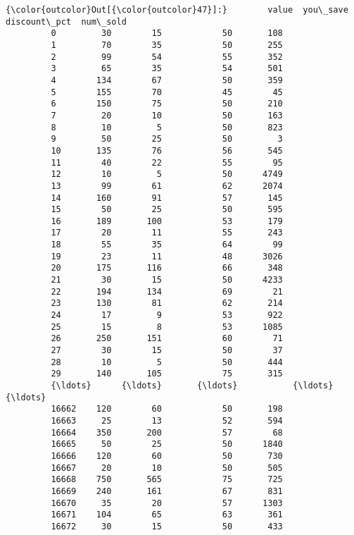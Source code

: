 \documentclass{article}
\begin{document}
            \begin{Verbatim}[commandchars=\\\{\}]
{\color{outcolor}Out[{\color{outcolor}47}]:}        value  you\_save  discount\_pct  num\_sold
         0         30        15            50       108
         1         70        35            50       255
         2         99        54            55       352
         3         65        35            54       501
         4        134        67            50       359
         5        155        70            45        45
         6        150        75            50       210
         7         20        10            50       163
         8         10         5            50       823
         9         50        25            50         3
         10       135        76            56       545
         11        40        22            55        95
         12        10         5            50      4749
         13        99        61            62      2074
         14       160        91            57       145
         15        50        25            50       595
         16       189       100            53       179
         17        20        11            55       243
         18        55        35            64        99
         19        23        11            48      3026
         20       175       116            66       348
         21        30        15            50      4233
         22       194       134            69        21
         23       130        81            62       214
         24        17         9            53       922
         25        15         8            53      1085
         26       250       151            60        71
         27        30        15            50        37
         28        10         5            50       444
         29       140       105            75       315
         {\ldots}      {\ldots}       {\ldots}           {\ldots}       {\ldots}
         16662    120        60            50       198
         16663     25        13            52       594
         16664    350       200            57        68
         16665     50        25            50      1840
         16666    120        60            50       730
         16667     20        10            50       505
         16668    750       565            75       725
         16669    240       161            67       831
         16670     35        20            57      1303
         16671    104        65            63       361
         16672     30        15            50       433

\end{Verbatim}
\end{document}
